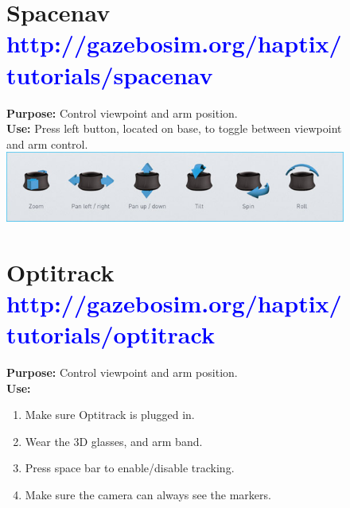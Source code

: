 \documentclass[11pt, letterpaper, landscape]{article}
\begin{document}
\begin{figure}[!htb]
  \centering

  \begin{minipage}[t]{0.48\textwidth}
    \begin{tcolorbox}[height=6cm,colback=gray!8,colframe=gray!15]
      \section*{Spacenav \textcolor{blue}{\textnormal{\small http://gazebosim.org/haptix/tutorials/spacenav}}}
      {\bf Purpose:} Control viewpoint and arm position.\\
      {\bf Use:} Press left button, located on base, to toggle between viewpoint and arm control.\\
      \newline
      \includegraphics[width=1.0\textwidth]{spacenav_control.jpg}
    \end{tcolorbox}
  \end{minipage}%
  \hspace{0.02\textwidth}%
  \begin{minipage}[t]{0.48\textwidth}
    \begin{tcolorbox}[height=6cm,colback=gray!8,colframe=gray!15]
      \section*{Optitrack \textcolor{blue}{\textnormal{\small http://gazebosim.org/haptix/tutorials/optitrack}}}
      {\bf Purpose:} Control viewpoint and arm position.\\
      {\bf Use:}
      \begin{enumerate}
        \item Make sure Optitrack is plugged in.
        \item Wear the 3D glasses, and arm band. 
        \item Press space bar to enable/disable tracking. 
        \item Make sure the camera can always see the markers.
      \end{enumerate}
    \end{tcolorbox}
  \end{minipage}%

\end{figure}
\end{document}
